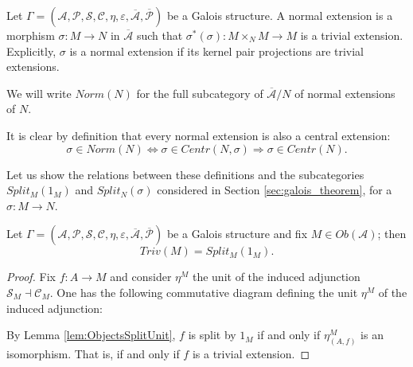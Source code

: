 \begin{definition}
    Let $\Gamma = (\mathcal{A}, \mathcal{P}, \mathcal{S}, \mathcal{C}, \eta, \varepsilon, \overline{\mathcal{A}}, \overline{\mathcal{P}})$ be a Galois structure. A normal extension is a morphism $\sigma:M\to N$ in $\overline{\mathcal{A}}$ such that $\sigma^*(\sigma):M\times_NM\to M$ is a trivial extension. Explicitly, $\sigma$ is a normal extension if its kernel pair projections are trivial extensions.
    
    We will write $Norm(N)$ for the full subcategory of $\overline{\mathcal{A}}/N$ of normal extensions of $N$.
\end{definition}
\begin{oss*}
    It is clear by definition that every normal extension is also a central extension:
    \[ \sigma\in Norm(N) \iff \sigma \in Centr(N,\sigma) \Longrightarrow \sigma \in Centr(N). \]
\end{oss*}

Let us show the relations between these definitions and the subcategories $Split_M(1_M)$ and $Split_N(\sigma)$ considered in Section \ref{sec:galois_theorem}, for a $\sigma:M\to N$.
\begin{proposition}
\label{prop:Trivial=Split}
    Let $\Gamma = (\mathcal{A}, \mathcal{P}, \mathcal{S}, \mathcal{C}, \eta, \varepsilon, \overline{\mathcal{A}}, \overline{\mathcal{P}})$ be a Galois structure and fix $M\in Ob(\mathcal{A})$; then 
    \[ Triv(M)=Split_M(1_M). \]
    \begin{proof}
        Fix $f:A\to M$ and consider $\eta^M$ the unit of the induced adjunction $\mathcal{S}_M\dashv\mathcal{C}_M$. One has the following commutative diagram defining the unit $\eta^M$ of the induced adjunction:
        \begin{center}
        \end{center}
        By Lemma \ref{lem:ObjectsSplitUnit}, $f$ is split by $1_M$ if and only if $\eta_{(A,f)}^M$ is an isomorphism. That is, if and only if $f$ is a trivial extension.
    \end{proof}
\end{proposition}

